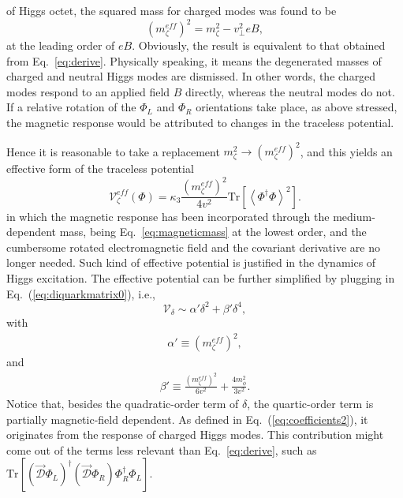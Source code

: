 \documentclass[12pt]{article}
\begin{document}
of Higgs octet, the squared mass for charged modes was found to be
\begin{equation}
\label{eq:magneticmass}
(m_\zeta^{eff})^2 = m_\zeta^2 - v_\perp^2eB,
\end{equation}
at the leading order of $eB$. Obviously, the result is equivalent to that obtained from Eq.~\eqref{eq:derive}.
Physically speaking, it means the degenerated masses of charged and neutral
Higgs modes are dismissed.
In other words, the charged modes respond to an applied field $B$ directly, whereas the neutral modes do not.
If a relative rotation of the $\Phi_L$ and $\Phi_R$ orientations take place,
as above stressed, the magnetic response would be attributed to changes in the traceless potential.

Hence it is reasonable to take a replacement $m_\zeta^2 \rightarrow (m_\zeta^{eff})^2$, and this yields
an effective form of the traceless potential
\begin{equation}
 \mathcal{V}_\zeta^{eff}(\Phi)=\kappa_3\frac{(m_\zeta^{eff})^2}{4v^2}\text{Tr}\left[\left<\Phi^\dagger\Phi\right>^2\right].
\end{equation}
in which the magnetic response has been incorporated through the medium-dependent mass, being
Eq.~\eqref{eq:magneticmass} at the lowest order, and the cumbersome
rotated electromagnetic field and the covariant derivative are no longer needed.
Such kind of effective potential is justified in the dynamics of Higgs excitation.
The effective potential can be further simplified by plugging in Eq.~(\ref{eq:diquarkmatrix0}), i.e.,
\begin{equation}
\label{eq:deltapotential1}
\mathcal{V}_\delta \sim  \alpha' \delta^2 + \beta'\delta^4,
\end{equation}
with
\begin{eqnarray}
  \label{eq:coefficients}
\alpha' \equiv (m_\zeta^{eff})^2,
\end{eqnarray}
and
\begin{eqnarray}
  \label{eq:coefficients2}
\beta' \equiv \frac{(m_\zeta^{eff})^2}{6v^2} + \frac{4 m_\phi^2}{3v^2}.
\end{eqnarray}
Notice that, besides the quadratic-order term of $\delta$, the quartic-order term is partially magnetic-field dependent.
As defined in Eq.~(\ref{eq:coefficients2}), it originates from the response of charged Higgs modes.
This contribution might come out of the terms less relevant than Eq.~\eqref{eq:derive},
such as $\text{Tr}[(\vec{\mathcal{D}}\Phi_L)^\dagger(\vec{\mathcal{D}}\Phi_R) \Phi_R^\dagger\Phi_L]$.
\end{document}
